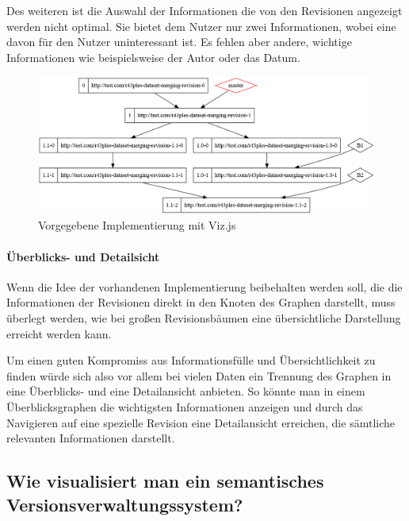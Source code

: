 \documentclass[color, ddc]{tudscrreprt}
\begin{document}
Des weiteren ist die Auswahl der Informationen die von den Revisionen angezeigt werden nicht optimal. Sie bietet dem Nutzer nur zwei Informationen, wobei eine davon für den Nutzer uninteressant ist. Es fehlen aber andere, wichtige Informationen wie beispielsweise der Autor oder das Datum.

\begin{figure}[ht!]
\centering
\includegraphics[width=\textwidth]{Skizzen/vizjs.png}
\caption{Vorgegebene Implementierung mit Viz.js}
\end{figure}

\paragraph{Überblicks- und Detailsicht}\label{parag-2ansichten}

Wenn die Idee der vorhandenen Implementierung beibehalten werden soll, die die Informationen der Revisionen direkt in den Knoten des Graphen darstellt, muss überlegt werden, wie bei großen Revisionsbäumen eine übersichtliche Darstellung erreicht werden kann.

Um einen guten Kompromiss aus Informationsfülle und Übersichtlichkeit zu finden würde sich also vor allem bei vielen Daten ein Trennung des Graphen in eine Überblicks- und eine Detailansicht anbieten. So könnte man in einem Überblicksgraphen die wichtigsten Informationen anzeigen und durch das Navigieren auf eine spezielle Revision eine Detailansicht erreichen, die sämtliche relevanten Informationen darstellt.

\subsection*{Wie visualisiert man ein semantisches Versionsverwaltungssystem?}

\end{document}

